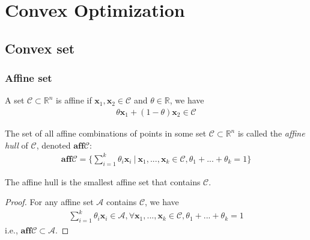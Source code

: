 \chapter{Convex Optimization}
\vspace{1em}
\section{Convex set}
\subsection{Affine set}
\begin{definition}
    A set $\mathcal{C} \subset \mathbb{R}^n$ is affine
    if $\mathbf{x}_1, \mathbf{x}_2 \in \mathcal{C}$
    and $\theta \in \mathbb{R}$, we have
    \begin{align}
        \theta \mathbf{x}_1 + 
        (1 - \theta)\mathbf{x}_2
        \in \mathcal{C}
    \end{align}
\end{definition}

\begin{definition}
    The set of all affine combinations of points
    in some set $\mathcal{C} \subset \mathbb{R}^n$
    is called the \emph{affine hull} of $\mathcal{C}$,
    denoted $\mathbf{aff}\mathcal{C}$:
    \begin{align}
        \mathbf{aff}\mathcal{C} = \{
            \sum_{i=1}^k \theta_i \mathbf{x}_i \ | \ 
            \mathbf{x}_1,...,\mathbf{x}_k \in \mathcal{C},
            \theta_1 + ... + \theta_k = 1\}
    \end{align}
\end{definition}
\begin{remark}
    The affine hull is the smallest affine set
    that contains $\mathcal{C}$.
\end{remark}
\begin{proof}
    For any affine set $\mathcal{A}$ contains $\mathcal{C}$,
    we have
    \begin{align}
        \sum_{i=1}^k \theta_i \mathbf{x}_i \in \mathcal{A},
        \forall \mathbf{x}_1,...,\mathbf{x}_k \in \mathcal{C},
            \theta_1 + ... + \theta_k = 1
    \end{align}
    i.e., $\mathbf{aff}\mathcal{C} \subset \mathcal{A}$.
\end{proof}

